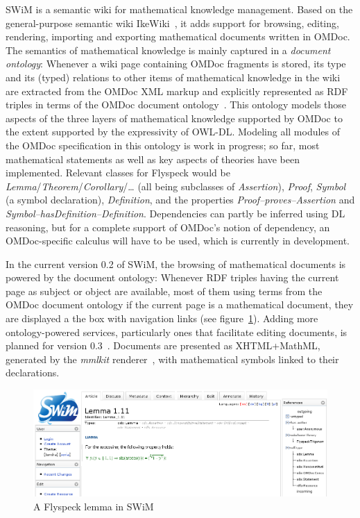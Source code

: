 \documentclass{llncs}
\begin{document}
SWiM is a semantic wiki for mathematical knowledge management.  Based on the
general-purpose semantic wiki IkeWiki~\cite{KrSchVr:semwiki-reasoning07}, it adds support
for browsing, editing, rendering, importing and exporting mathematical documents written
in OMDoc.  The semantics of mathematical knowledge is mainly captured in a \emph{document
  ontology}: Whenever a wiki page containing OMDoc fragments is stored, its type and its
(typed) relations to other items of mathematical knowledge in the wiki are extracted from
the OMDoc XML markup and explicitly represented as RDF triples in terms of the OMDoc
document ontology~\cite{OMDocDocOnto:web}.  This ontology models those aspects of the
three layers of mathematical knowledge supported by OMDoc to the extent supported by the
expressivity of OWL-DL.  Modeling all modules of the OMDoc specification in this ontology
is work in progress; so far, most mathematical statements as well as key aspects of
theories have been implemented.  Relevant
classes for Flyspeck would be \textit{Lemma}/\textit{Theorem}/\textit{Corollary}/\ldots
(all being subclasses of \textit{Assertion}), \textit{Proof}, \textit{Symbol} (a symbol
declaration), \textit{Definition}, and the properties \textit{Proof--proves--Assertion}
and \textit{Symbol--hasDefinition--Definition}.  Dependencies can partly be inferred using
DL reasoning, but for a complete support of OMDoc's notion of dependency, an
OMDoc-specific calculus will have to be used, which is currently in development.

In the current version 0.2 of SWiM, the browsing of mathematical documents is powered by
the document ontology: Whenever RDF triples having the current page as subject or object
are available, most of them using terms from the OMDoc document ontology if the current
page is a mathematical document, they are displayed a the box with navigation links (see
figure~\ref{fig:swim-lemma}).  Adding more ontology-powered services, particularly ones
that facilitate editing documents, is planned for version
0.3~\cite{swim-roadmap,Lange:SWiMSciColl07}.  Documents are presented as XHTML+MathML,
generated by the \textit{mmlkit} renderer~\cite{mmlkit:web}, with mathematical symbols
linked to their declarations.

\begin{figure}
  \centering
  \includegraphics[width=.7\textwidth]{swim-lemma}
  \caption{A Flyspeck lemma in SWiM}
  \label{fig:swim-lemma}
\end{figure}
\end{document}
